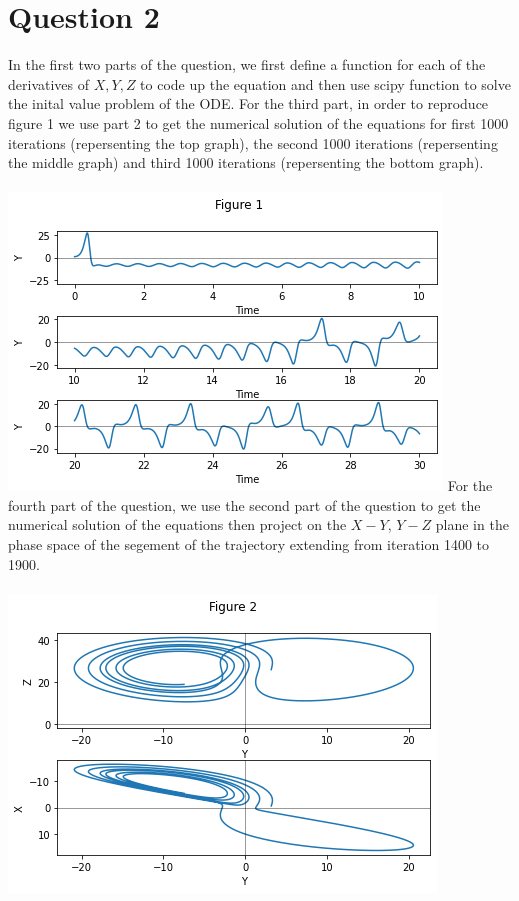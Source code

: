 \documentclass{article}
\begin{document}
\section{Question 2}
In the first two parts of the question, we first define a function for each of the derivatives of $X, Y, Z$ to code up the equation and then use scipy function to solve the inital value problem of the ODE. For the third part, in order to reproduce figure 1 we use part 2 to get the numerical solution of the equations for first 1000 iterations (repersenting the top graph), the second 1000 iterations (repersenting the middle graph) and third 1000 iterations (repersenting the bottom graph).
\\\\
\includegraphics[width=\textwidth]{figure1.png}
\newpage
\noindent
For the fourth part of the question, we use the second part of the question to get the numerical solution of the equations then project on the $X-Y$, $Y-Z$ plane in the phase space of the segement of the trajectory extending from iteration 1400 to 1900. 
\\\\
\includegraphics[width=\textwidth]{figure2.png}
\end{document}
